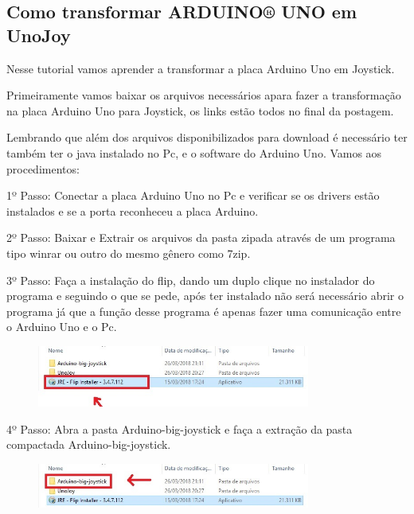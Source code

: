 \documentclass[
	12pt,			%
	openright,		%
	oneside,			%
	a4paper,			%
	chapter=TITLE,		%
	english,			%
	brazil,			%
	]{abntex2}
\begin{document}
\begin{anexosenv}

\partanexos

\chapter{Como transformar ARDUINO® UNO em UnoJoy}
\label{ref:anexoa}

Nesse tutorial vamos aprender a transformar a placa Arduino Uno em Joystick.

Primeiramente vamos baixar os arquivos necessários apara fazer a transformação na placa Arduino Uno para Joystick, os links estão todos no final da postagem.

Lembrando que além dos arquivos disponibilizados para download é necessário ter também ter o java instalado no Pc, e o software do Arduino Uno.
Vamos aos procedimentos:

1º Passo: Conectar a placa Arduino Uno no Pc e verificar se os drivers estão instalados e se a porta reconheceu a placa Arduino.

2º Passo: Baixar e Extrair os arquivos da pasta zipada através de um programa tipo winrar ou outro do mesmo gênero como 7zip.  

3º Passo: Faça a instalação do flip, dando um duplo clique no instalador do programa e seguindo o que se pede, após ter instalado não será necessário abrir o programa já que a função desse programa é apenas fazer uma comunicação entre o Arduino Uno e o Pc.

\begin{figure}[H]
	\centering
		\includegraphics[width=0.8\textwidth]{./img/anex-img-1.jpg}
\end{figure}

4º Passo: Abra a pasta Arduino-big-joystick e faça a extração da pasta compactada Arduino-big-joystick.

\begin{figure}[H]
	\centering
		\includegraphics[width=0.8\textwidth]{./img/anex-img-2.jpg}
\end{figure}


\end{anexosenv}
\end{document}
